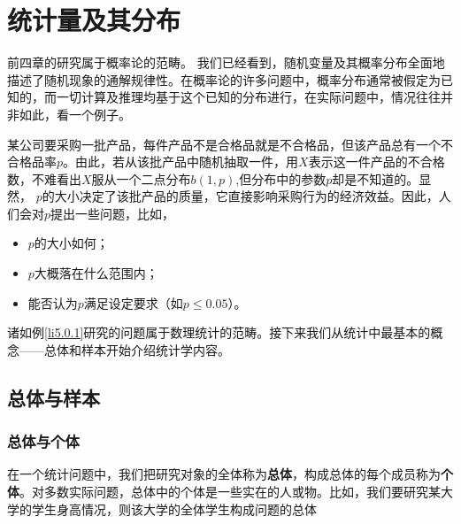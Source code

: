 \chapter{统计量及其分布}
前四章的研究属于概率论的范畴。 我们已经看到，随机变量及其概率分布全面地描述了随机现象的通解规律性。在概率论的许多问题中，概率分布通常被假定为已知的，而一切计算及推理均基于这个已知的分布进行，在实际问题中，情况往往并非如此，看一个例子。
\begin{example}\label{li5.0.1}
某公司要采购一批产品，每件产品不是合格品就是不合格品，但该产品总有一个不合格品率$p$。由此，若从该批产品中随机抽取一件，用$X$表示这一件产品的不合格数，不难看出$X$服从一个二点分布$b(1,p)$,但分布中的参数$p$却是不知道的。显然， $p$的大小决定了该批产品的质量，它直接影响采购行为的经济效益。因此，人们会对$p$提出一些问题，比如，
\begin{itemize}
\item $p$的大小如何；
\item $p$大概落在什么范围内；
\item 能否认为$p$满足设定要求（如$p\le0.05$）。
\end{itemize}
\end{example}
诸如例\ref{li5.0.1}研究的问题属于数理统计的范畴。接下来我们从统计中最基本的概念——总体和样本开始介绍统计学内容。
\section{总体与样本}
\subsection{总体与个体}
在一个统计问题中，我们把研究对象的全体称为\textbf{总体}，构成总体的每个成员称为\textbf{个体}。对多数实际问题，总体中的个体是一些实在的人或物。比如，我们要研究某大学的学生身高情况，则该大学的全体学生构成问题的总体